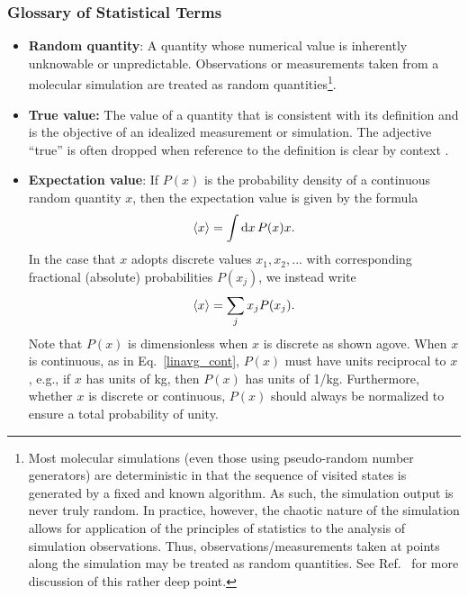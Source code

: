 \subsubsection{Glossary of Statistical Terms}
\begin{itemize}

\item {\bf Random quantity}: A quantity whose numerical value is inherently unknowable or unpredictable.
  Observations or measurements taken from a molecular simulation are treated as random quantities\footnote{Most molecular simulations (even those using pseudo-random number generators) are deterministic in that the sequence of visited states is generated by a fixed and known algorithm.  As such, the simulation output is never truly random.
In practice, however, the chaotic nature of the simulation allows for application of the principles of statistics to the analysis of simulation observations.
Thus, observations/measurements taken at points along the simulation may be treated as random quantities.
See Ref.~\cite{Leimkuhler} for more discussion of this rather deep point.}.

\item {\bf True value:}  The value of a quantity that is consistent with its definition and is the objective of an idealized measurement or simulation. The adjective ``true'' is often dropped when reference to the definition is clear by context \citep{JCGM:GUM2008,JCGM:VIM2012}.
  \label{def:true_value}

\item {\bf Expectation value}:  If $P(x)$ is the probability density of a continuous random quantity $x$, then the expectation value is given by the formula
\begin{align}
  \langle x \rangle = \int {\rm d}x\, P(x) x.
  \label{linavg_cont}
\end{align}
In the case that $x$ adopts discrete values $x_1,x_2,...$ with corresponding fractional (absolute) probabilities $P(x_j)$, we instead write
\begin{align}
  \langle x \rangle = \sum_j x_j P(x_j).
  \label{linavg}
\end{align}
Note that $P(x)$ is dimensionless when $x$ is discrete as shown agove.
When $x$ is continuous, as in Eq.~\ref{linavg_cont}, $P(x)$ must have units reciprocal to $x$, e.g., if $x$ has units of kg, then $P(x)$ has units of 1/kg. 
Furthermore, whether $x$ is discrete or continuous, $P(x)$ should always be normalized to ensure a total probability of unity.


\end{itemize}
